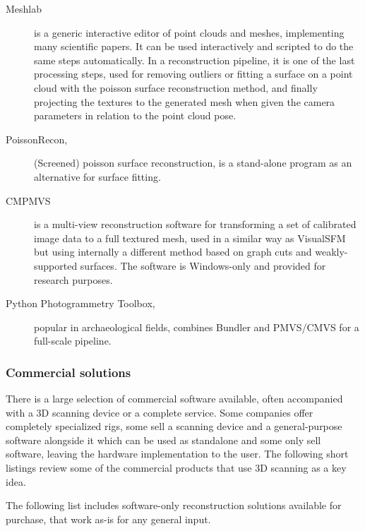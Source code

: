 \begin{description}
	\item[Meshlab] \cite{meshlab} is a generic interactive editor of point clouds and meshes, implementing many scientific papers.
		It can be used interactively and scripted to do the same steps automatically.
		In a reconstruction pipeline, it is one of the last processing steps, used for removing outliers or fitting a surface on a point cloud with the poisson surface reconstruction method, and finally projecting the textures to the generated mesh when given the camera parameters in relation to the point cloud pose.

	\item[PoissonRecon,] \cite{kazhdan2013screened} (Screened) poisson surface reconstruction, is a stand-alone program as an alternative for surface fitting.

	\item[CMPMVS] \cite{jancosek2011multi} is a multi-view reconstruction software for transforming a set of calibrated image data to a full textured mesh, used in a similar way as VisualSFM but using internally a different method based on graph cuts and weakly-supported surfaces.
		The software is Windows-only and provided for research purposes.

	\item[Python Photogrammetry Toolbox,] \cite{moulon2011python} popular in archaeological fields, combines Bundler and PMVS/CMVS for a full-scale pipeline.
\end{description}



\subsubsection{Commercial solutions} %

There is a large selection of commercial software available, often accompanied with a 3D scanning device or a complete service.
Some companies offer completely specialized rigs, some sell a scanning device and a general-purpose software alongside it which can be used as standalone and some only sell software, leaving the hardware implementation to the user.
The following short listings review some of the commercial products that use 3D scanning as a key idea.


The following list includes software-only reconstruction solutions available for purchase, that work as-is for any general input.

